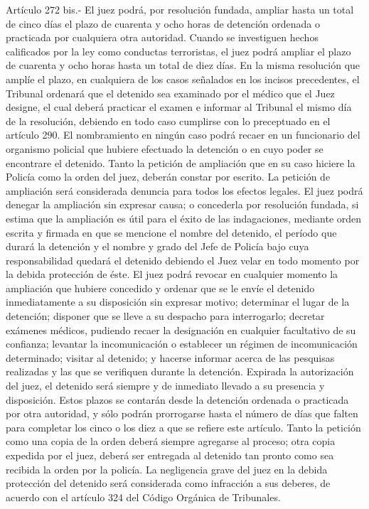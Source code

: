  Artículo 272 bis.- El juez  podrá, por resolución fundada, ampliar hasta un total de cinco días el plazo de cuarenta y ocho horas de detención ordenada o practicada por cualquiera otra autoridad.
    Cuando se investiguen hechos calificados por la ley como conductas terroristas, el juez podrá ampliar el plazo de cuarenta y ocho horas hasta un total de diez días.
    En la misma resolución que amplíe el plazo, en cualquiera de los casos señalados en los incisos precedentes, el Tribunal ordenará que el detenido sea examinado por el médico que el Juez designe, el cual deberá practicar el examen e informar al Tribunal el mismo día de la resolución, debiendo en todo caso cumplirse con lo preceptuado en el artículo 290. El nombramiento en ningún caso podrá recaer en un funcionario del organismo policial que hubiere efectuado la detención o en cuyo poder se encontrare el detenido.
    Tanto la petición de ampliación que en su caso hiciere la Policía como la orden del juez, deberán constar por escrito.
    La petición de ampliación será considerada denuncia para todos los efectos legales.
    El juez podrá denegar la ampliación sin expresar causa; o concederla por resolución fundada, si estima que la ampliación es útil para el éxito de las indagaciones, mediante orden escrita y firmada en que se mencione el nombre del detenido, el período que durará la detención y el nombre y grado del Jefe de Policía bajo cuya responsabilidad quedará el detenido debiendo el Juez velar en todo momento por la debida protección de éste.
    El juez podrá revocar en cualquier momento la ampliación que hubiere concedido y ordenar que se le envíe el detenido inmediatamente a su disposición sin expresar motivo; determinar el lugar de la detención; disponer que se lleve a su despacho para interrogarlo; decretar exámenes médicos, pudiendo recaer la designación en cualquier facultativo de su confianza; levantar la incomunicación o establecer un régimen de incomunicación determinado; visitar al detenido; y hacerse informar acerca de las pesquisas realizadas y las que se verifiquen durante la detención.
    Expirada la autorización del juez, el detenido será siempre y de inmediato llevado a su presencia y disposición.
    Estos plazos se contarán desde la detención ordenada o practicada por otra autoridad, y sólo podrán prorrogarse hasta el número de días que falten para completar los cinco o los diez a que se refiere este artículo.
    Tanto la petición como una copia de la orden deberá siempre agregarse al proceso; otra copia expedida por el juez, deberá ser entregada al detenido tan pronto como sea recibida la orden por la policía.
    La negligencia grave del juez en la debida protección del detenido será considerada como infracción a sus deberes, de acuerdo con el artículo 324 del Código Orgánica de Tribunales.

